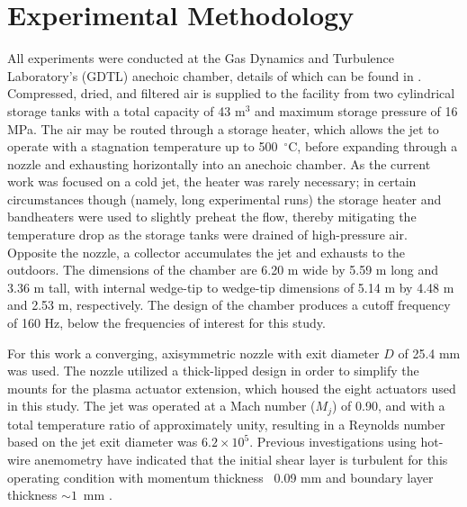 \section{Experimental Methodology}
\label{methodology}
All experiments were conducted at the Gas Dynamics and Turbulence Laboratory's (GDTL) anechoic chamber, details of which can be found in \citet{Hahn2011}. 
Compressed, dried, and filtered air is supplied to the facility from two cylindrical storage tanks with a total capacity of 43 m$^{3}$ and maximum storage pressure of 16 MPa.
The air may be routed through a storage heater, which allows the jet to operate with a stagnation temperature up to 500~$^\circ$C, before expanding through a nozzle and exhausting horizontally into an anechoic chamber. 
As the current work was focused on a cold jet, the heater was rarely necessary; in certain circumstances though (namely, long experimental runs) the storage heater and bandheaters were used to slightly preheat the flow, thereby mitigating the temperature drop as the storage tanks were drained of high-pressure air.
Opposite the nozzle, a collector accumulates the jet and exhausts to the outdoors. 
The dimensions of the chamber are 6.20 m wide by 5.59 m long and 3.36 m tall, with internal wedge-tip to wedge-tip dimensions of 5.14 m by 4.48 m and 2.53 m, respectively. 
The design of the chamber produces a cutoff frequency of 160 Hz, below the frequencies of interest for this study. 

For this work a converging, axisymmetric nozzle with exit diameter $D$ of 25.4 mm was used. 
The nozzle utilized a thick-lipped design in order to simplify the mounts for the plasma actuator extension, which housed the eight actuators used in this study. 
The jet was operated at a Mach number ($M_j$) of 0.90, and with a total temperature ratio of approximately unity, resulting in a Reynolds number based on the jet exit diameter was $6.2\times 10^5$.
Previous investigations using hot-wire anemometry have indicated that the initial shear layer is turbulent for this operating condition with momentum thickness ~0.09 mm and boundary layer thickness $\sim 1$~mm \citep{Kearney-Fischer2009}.


